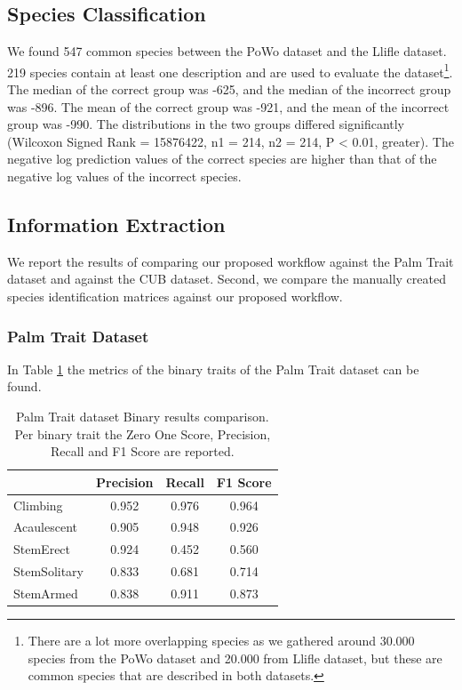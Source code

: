 \documentclass[a4paper, 12pt, oneside]{book} %
\begin{document}
\subsection{Species Classification}
We found 547 common species between the PoWo dataset and the Llifle dataset.
219 species contain at least one description and are used to evaluate the dataset\footnote{There are a lot more overlapping species as we gathered around 30.000 species from the PoWo dataset and 20.000 from Llifle dataset, but these are common species that are described in both datasets.}.
The median of the correct group was -625, and the median of the incorrect group was -896.
The mean of the correct group was -921, and the mean of the incorrect group was -990.
The distributions in the two groups differed significantly (Wilcoxon Signed Rank = 15876422, n1 = 214, n2 = 214, P < 0.01, greater).
The negative log prediction values of the correct species are higher than that of the negative log values of the incorrect species.


\subsection{Information Extraction}
We report the results of comparing our proposed workflow against the Palm Trait dataset and against the CUB dataset.
Second, we compare the manually created species identification matrices against our proposed workflow.

\subsubsection{Palm Trait Dataset}
In Table \ref{tab:palm_trait_binary} the metrics of the binary traits of the Palm Trait dataset can be found.
\begin{table}[htpb]
\centering
\caption[Palm Trait dataset Binary results comparison]{Palm Trait dataset Binary results comparison. Per binary trait the Zero One Score, Precision, Recall and F1 Score are reported.}
\label{tab:palm_trait_binary}
\begin{tabular}{@{}lccc@{}}
\cmidrule(l){2-4}
             & \textbf{Precision} & \textbf{Recall} & \textbf{F1 Score} \\ \midrule
Climbing     & 0.952              & 0.976           & 0.964             \\ \midrule
Acaulescent  & 0.905              & 0.948           & 0.926             \\ \midrule
StemErect    & 0.924              & 0.452           & 0.560             \\ \midrule
StemSolitary & 0.833              & 0.681           & 0.714            \\ \midrule
StemArmed    & 0.838              & 0.911           & 0.873             \\ \bottomrule
\end{tabular}
\end{table}
\end{document}
